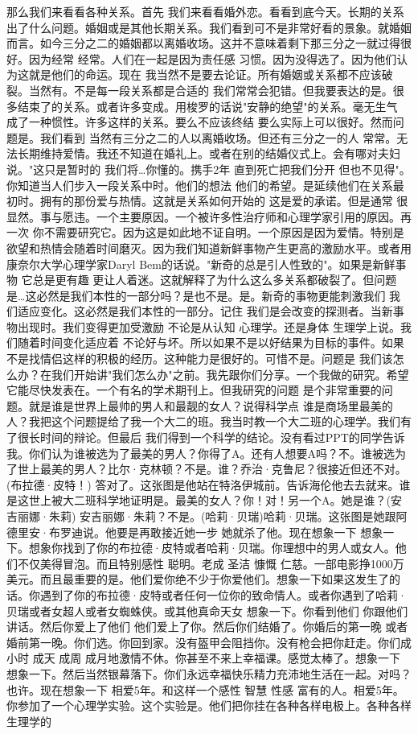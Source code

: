 那么我们来看看各种关系。首先 我们来看看婚外恋。看看到底今天。长期的关系出了什么问题。婚姻或是其他长期关系。我们看到可不是非常好看的景象。就婚姻而言。如今三分之二的婚姻都以离婚收场。这并不意味着剩下那三分之一就过得很好。因为经常 经常。人们在一起是因为责任感 习惯。因为没得选了。因为他们认为这就是他们的命运。现在 我当然不是要去论证。所有婚姻或关系都不应该破裂。当然有。不是每一段关系都是合适的 我们常常会犯错。但我要表达的是。很多结束了的关系。或者许多变成。用梭罗的话说"安静的绝望"的关系。毫无生气 成了一种惯性。许多这样的关系。要么不应该终结 要么实际上可以很好。然而问题是。我们看到 当然有三分之二的人以离婚收场。但还有三分之一的人 常常。无法长期维持爱情。我还不知道在婚礼上。或者在别的结婚仪式上。会有哪对夫妇说。"这只是暂时的 我们将…你懂的。携手2年 直到死亡把我们分开 但也不见得"。你知道当人们步入一段关系中时。他们的想法 他们的希望。是延续他们在关系最初时。拥有的那份爱与热情。这就是关系如何开始的 这是爱的承诺。但是通常 很显然。事与愿违。一个主要原因。一个被许多性治疗师和心理学家引用的原因。再一次 你不需要研究它。因为这是如此地不证自明。一个原因是因为爱情。特别是欲望和热情会随着时间磨灭。因为我们知道新鲜事物产生更高的激励水平。或者用康奈尔大学心理学家Daryl Bem的话说。"新奇的总是引人性致的"。如果是新鲜事物 它总是更有趣 更让人着迷。这就解释了为什么这么多关系都破裂了。但问题是…这必然是我们本性的一部分吗？是也不是。是。新奇的事物更能刺激我们 我们适应变化。这必然是我们本性的一部分。记住 我们是会改变的探测者。当新事物出现时。我们变得更加受激励 不论是从认知 心理学。还是身体 生理学上说。我们随着时间变化适应着 不论好与坏。所以如果不是以好结果为目标的事件。如果不是找情侣这样的积极的经历。这种能力是很好的。可惜不是。问题是 我们该怎么办？在我们开始讲"我们怎么办"之前。我先跟你们分享。一个我做的研究。希望它能尽快发表在。一个有名的学术期刊上。但我研究的问题 是个非常重要的问题。就是谁是世界上最帅的男人和最靓的女人？说得科学点 谁是商场里最美的人？我把这个问题提给了我一个大二的班。我当时教一个大二班的心理学。我们有了很长时间的辩论。但最后 我们得到一个科学的结论。没有看过PPT的同学告诉我。你们认为谁被选为了最美的男人？你得了A。还有人想要A吗？不。谁被选为了世上最美的男人？比尔·克林顿？不是。谁？乔治·克鲁尼？很接近但还不对。(布拉德·皮特！) 答对了。这张图是他站在特洛伊城前。告诉海伦他去去就来。谁是这世上被大二班科学地证明是。最美的女人？你！对！另一个A。她是谁？(安吉丽娜·朱莉) 安吉丽娜·朱莉？不是。(哈莉·贝瑞)哈莉·贝瑞。这张图是她跟阿德里安·布罗迪说。他要是再敢接近她一步 她就杀了他。现在想象一下 想象一下。想象你找到了你的布拉德·皮特或者哈莉·贝瑞。你理想中的男人或女人。他们不仅美得冒泡。而且特别感性 聪明。老成 圣洁 慷慨 仁慈。一部电影挣1000万美元。而且最重要的是。他们爱你绝不少于你爱他们。想象一下如果这发生了的话。你遇到了你的布拉德·皮特或者任何一位你的致命情人。或者你遇到了哈莉·贝瑞或者女超人或者女蜘蛛侠。或其他真命天女 想象一下。你看到他们 你跟他们讲话。然后你爱上了他们 他们爱上了你。然后你们结婚了。你婚后的第一晚 或者婚前第一晚。你们选。你回到家。没有盔甲会阻挡你。没有枪会把你赶走。你们成小时 成天 成周 成月地激情不休。你甚至不来上幸福课。感觉太棒了。想象一下 想象一下。然后当然银幕落下。你们永远幸福快乐精力充沛地生活在一起。对吗？也许。现在想象一下 相爱5年。和这样一个感性 智慧 性感 富有的人。相爱5年。你参加了一个心理学实验。这个实验是。他们把你挂在各种各样电极上。各种各样生理学的 